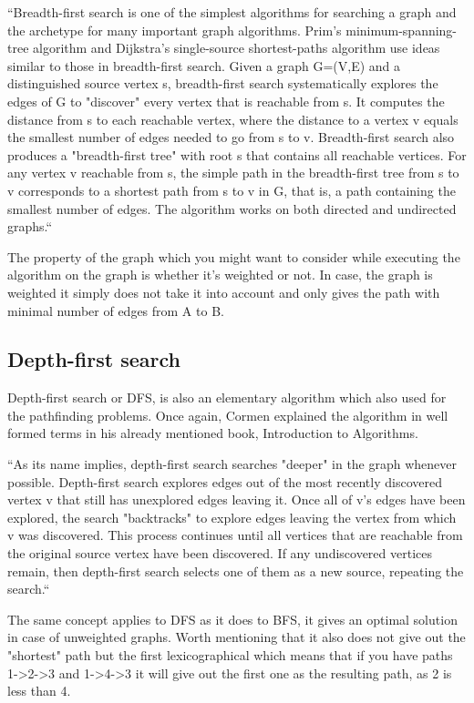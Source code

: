 ``Breadth-first search is one of the simplest algorithms for searching a graph and the archetype for many important graph algorithms. Prim’s minimum-spanning- tree algorithm and Dijkstra’s single-source shortest-paths algorithm use ideas similar to those in breadth-first search. Given a graph G=(V,E) and a distinguished source vertex s, breadth-first search systematically explores the edges of G to "discover" every vertex that is reachable from s. It computes the distance from s to each reachable vertex, where the distance to a vertex v equals the smallest number of edges needed to go from s to v. Breadth-first search also produces a "breadth-first tree" with root s that contains all reachable vertices. For any vertex v reachable from s, the simple path in the breadth-first tree from s to v corresponds to a shortest path from s to v in G, that is, a path containing the smallest number of edges. The algorithm works on both directed and undirected graphs.``~\cite{cormen-introduction-to-algorithms}

The property of the graph which you might want to consider while executing the algorithm on the graph is whether it's weighted or not. In case, the graph is weighted it simply does not take it into account and only gives the path with minimal number of edges from A to B.

\subsection{Depth-first search}

Depth-first search or DFS, is also an elementary algorithm which also used for the pathfinding problems. Once again, Cormen explained the algorithm in well formed terms in his already mentioned book, Introduction to Algorithms.

``As its name implies, depth-first search searches "deeper" in the graph whenever possible. Depth-first search explores edges out of the most recently discovered vertex v that still has unexplored edges leaving it. Once all of v’s edges have been explored, the search "backtracks" to explore edges leaving the vertex from which v was discovered. This process continues until all vertices that are reachable from the original source vertex have been discovered. If any undiscovered vertices remain, then depth-first search selects one of them as a new source, repeating the search.``~\cite{cormen-introduction-to-algorithms}

The same concept applies to DFS as it does to BFS, it gives an optimal solution in case of unweighted graphs. Worth mentioning that it also does not give out the "shortest" path but the first lexicographical which means that if you have paths 1->2->3 and 1->4->3 it will give out the first one as the resulting path, as 2 is less than 4.


